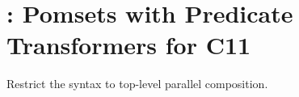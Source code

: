 \section{\PwTcTITLE: Pomsets with Predicate Transformers for C11}

Restrict the syntax to top-level parallel composition.




    

